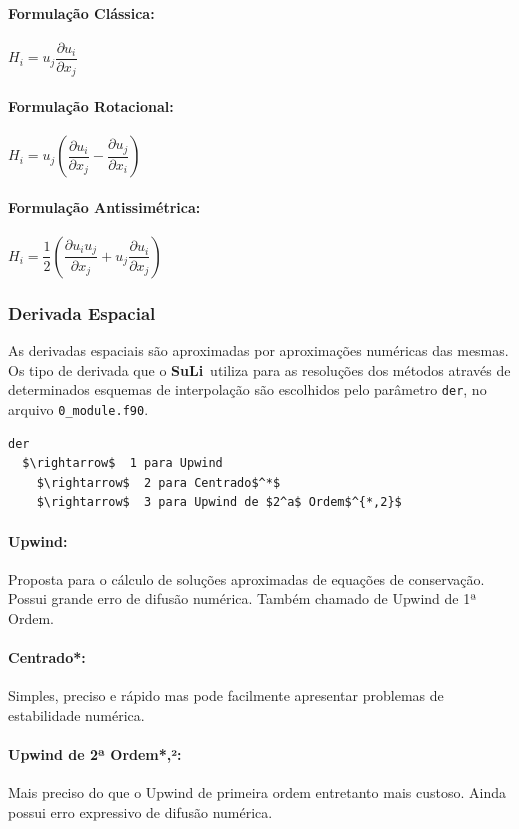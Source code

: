 \documentclass[12pt, a4paper]{article}
\newcommand{\SL}{{\bf SuLi}}
\begin{document}
\paragraph{Formulação Clássica:} $H_i = u_j  \dfrac{\partial u_i}{\partial x_j}$
\paragraph{Formulação Rotacional:} $H_i = u_j \left(\dfrac{\partial u_i}{\partial x_j} - \dfrac{\partial u_j}{\partial x_i}\right)$
\paragraph{Formulação Antissimétrica:} $H_i = \dfrac{1}{2} \left(\dfrac{\partial u_i u_j}{\partial x_j} + u_j\dfrac{\partial u_i}{\partial x_j}\right)$

\subsubsection{Derivada Espacial}
As derivadas espaciais são aproximadas por aproximações numéricas das mesmas. Os tipo de derivada que o \SL\ utiliza para as resoluções dos métodos através de determinados esquemas de interpolação são escolhidos pelo parâmetro \verb|der|, no arquivo \verb|0_module.f90|.
\begin{lstlisting}[escapeinside='']
der	
  $\rightarrow$  1 para Upwind
	$\rightarrow$  2 para Centrado$^*$
	$\rightarrow$  3 para Upwind de $2^a$ Ordem$^{*,2}$
\end{lstlisting}

\paragraph{Upwind:} Proposta para o cálculo de soluções aproximadas de equações de conservação. Possui grande erro de difusão numérica. Também chamado de Upwind de 1ª Ordem.
\paragraph{Centrado*:} Simples, preciso e rápido mas pode facilmente apresentar problemas de estabilidade numérica.
\paragraph{Upwind de 2ª Ordem*,²:} Mais preciso do que o Upwind de primeira ordem entretanto mais custoso. Ainda possui erro expressivo de difusão numérica. 
\end{document}
